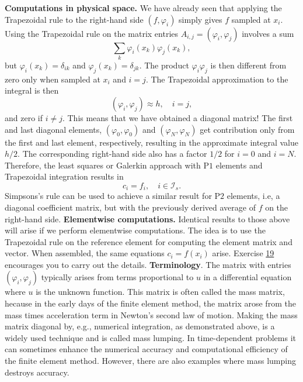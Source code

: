 \documentclass[../main.tex]{subfiles}
\begin{document}
	\noindent \textbf{Computations in physical space.} We have already seen that applying the Trapezoidal rule to the right-hand side $\left(f, \varphi_{i}\right)$ simply gives $f$ sampled at $x_{i}$. Using the Trapezoidal rule on the matrix entries $A_{i, j}=\left(\varphi_{i}, \varphi_{j}\right)$ involves a sum
	$$
	\sum_{k} \varphi_{i}\left(x_{k}\right) \varphi_{j}\left(x_{k}\right),
	$$
	but $\varphi_{i}\left(x_{k}\right)=\delta_{i k}$ and $\varphi_{j}\left(x_{k}\right)=\delta_{j k}$. The product $\varphi_{i} \varphi_{j}$ is then different from zero only when sampled at $x_{i}$ and $i=j$. The Trapezoidal approximation to the integral is then
	$$
	\left(\varphi_{i}, \varphi_{j}\right) \approx h, \quad i=j,
	$$
	and zero if $i \neq j$. This means that we have obtained a diagonal matrix! The first and last diagonal elements, $\left(\varphi_{0}, \varphi_{0}\right)$ and $\left(\varphi_{N}, \varphi_{N}\right)$ get contribution only from the first and last element, respectively, resulting in the approximate integral value $h / 2$. The corresponding right-hand side also has a factor $1 / 2$ for $i=0$ and $i=N$. Therefore, the least squares or Galerkin approach with $\mathrm{P} 1$ elements and Trapezoidal integration results in
	$$
	c_{i}=f_{i}, \quad i \in \mathcal{I}_{s} .
	$$
	Simpsons's rule can be used to achieve a similar result for $\mathrm{P} 2$ elements, i.e, a diagonal coefficient matrix, but with the previously derived average of $f$ on the right-hand side.
	\bigbreak
	\noindent \textbf{Elementwise computations.} Identical results to those above will arise if we perform elementwise computations. The idea is to use the Trapezoidal rule on the reference element for computing the element matrix and vector. When assembled, the same equations $c_{i}=f\left(x_{i}\right)$ arise. Exercise \hyperref[sec:sec_10_19]{19} encourages you to carry out the details.
	\bigbreak
	\noindent \textbf{Terminology}. The matrix with entries $\left(\varphi_{i}, \varphi_{j}\right)$ typically arises from terms proportional to $u$ in a differential equation where $u$ is the unknown function. This matrix is often called the mass matrix, hecause in the early days of the finite element method, the matrix arose from the mass times acceleration term in Newton's second law of motion. Making the mass matrix diagonal by, e.g., numerical integration, as demonstrated above, is a widely used technique and is called mass lumping. In time-dependent problems it can sometimes enhance the numerical accuracy and computational efficiency of the finite element method. However, there are also examples where mass lumping destroys accuracy.
	
\clearpage
\end{document}
